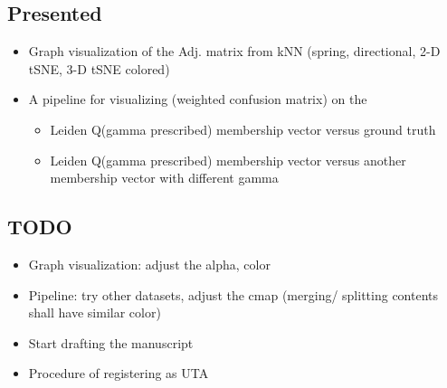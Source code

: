 
\begin{multicols}{2}
\subsection*{Presented}
\begin{itemize}[label=\textbullet]
    \item Graph visualization of the Adj. matrix from kNN (spring, directional, 2-D tSNE, 3-D tSNE colored)
    \item A pipeline for visualizing (weighted confusion matrix) on the
    \begin{itemize}
        \item Leiden Q(gamma prescribed) membership vector versus ground truth
        \item Leiden Q(gamma prescribed) membership vector versus another membership vector with different gamma
    \end{itemize}
\end{itemize}

\columnbreak %

\subsection*{TODO}
\begin{itemize}[label=\textbullet]
    \item Graph visualization: adjust the alpha, color
    \item Pipeline: try other datasets, adjust the cmap (merging/ splitting contents shall have similar color)
    \item Start drafting the manuscript
    \item Procedure of registering as UTA
\end{itemize}
\end{multicols}

\newpage